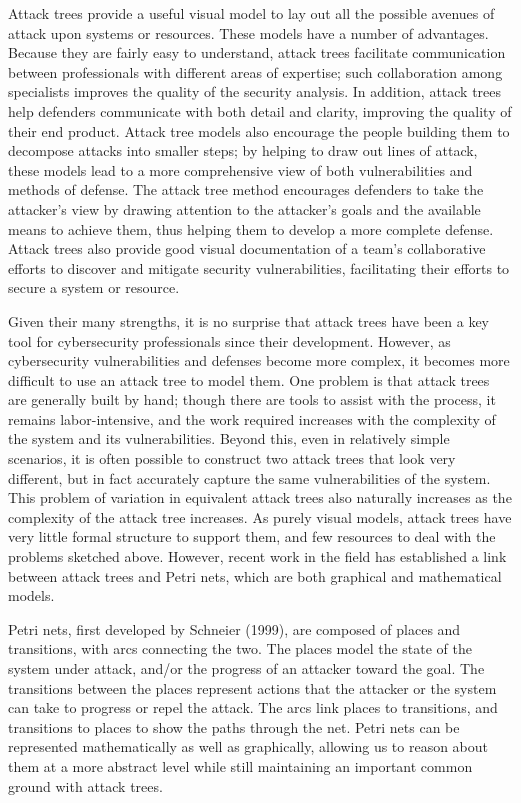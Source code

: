 \par Attack trees provide a useful visual model to lay out all the possible avenues of attack upon systems or resources. These models have a number of advantages. Because they are fairly easy to understand, attack trees facilitate communication between professionals with different areas of expertise; such collaboration among specialists improves the quality of the security analysis. In addition, attack trees help defenders communicate with both detail and clarity, improving the quality of their end product. Attack tree models also encourage the people building them to decompose attacks into smaller steps; by helping to draw out lines of attack, these models lead to a more comprehensive view of both vulnerabilities and methods of defense. The attack tree method encourages defenders to take the attacker's view by drawing attention to the attacker's goals and the available means to achieve them, thus helping them to develop a more complete defense. Attack trees also provide good visual documentation of a team's collaborative efforts to discover and mitigate security vulnerabilities, facilitating their efforts to secure a system or resource. 
\par Given their many strengths, it is no surprise that attack trees have been a key tool for cybersecurity professionals since their development. However, as cybersecurity vulnerabilities and defenses become more complex, it becomes more difficult to use an attack tree to model them. One problem is that attack trees are generally built by hand; though there are tools to assist with the process, it remains labor-intensive, and the work required increases with the complexity of the system and its vulnerabilities. Beyond this, even in relatively simple scenarios, it is often possible to construct two attack trees that look very different, but in fact accurately capture the same vulnerabilities of the system. This problem of variation in equivalent attack trees also naturally increases as the complexity of the attack tree increases. As purely visual models, attack trees have very little formal structure to support them, and few resources to deal with the problems sketched above. However, recent work in the field has established a link between attack trees and Petri nets, which are both graphical and mathematical models.
\par Petri nets, first developed by Schneier (1999), are composed of places and transitions, with arcs connecting the two. The places model the state of the system under attack, and/or the progress of an attacker toward the goal. The transitions between the places represent actions that the attacker or the system can take to progress or repel the attack. The arcs link places to transitions, and transitions to places to show the paths through the net. Petri nets can be represented mathematically as well as graphically, allowing us to reason about them at a more abstract level while still maintaining an important common ground with attack trees. 
